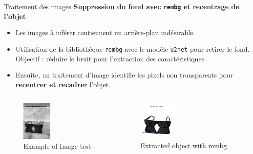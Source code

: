 \documentclass{beamer}
\begin{document}
\begin{frame}{Traitement des images}
    \footnotesize
    \textbf{Suppression du fond avec \texttt{rembg} et recentrage de l'objet}
    \begin{itemize}
        \item Les images à inférer contiennent un arrière-plan indésirable.
        \item Utilisation de la bibliothèque \texttt{rembg} avec le modèle \texttt{u2net} pour retirer le fond. Objectif : réduire le bruit pour l'extraction des caractéristiques. 
        \item Ensuite, un traitement d’image identifie les pixels non transparents pour \textbf{recentrer et recadrer} l’objet.
    \end{itemize}
    \begin{columns}
        \begin{figure}
            \includegraphics[width=0.4\textwidth]{assets/IMG_6883.jpg}
            \caption{Example of Image test}
        \end{figure}
        \begin{figure}
            \includegraphics[width=0.4\textwidth]{assets/glasses_rembg.png}
            \caption{Extracted object with rembg}
        \end{figure}
    \end{columns}
\end{frame}
\end{document}

